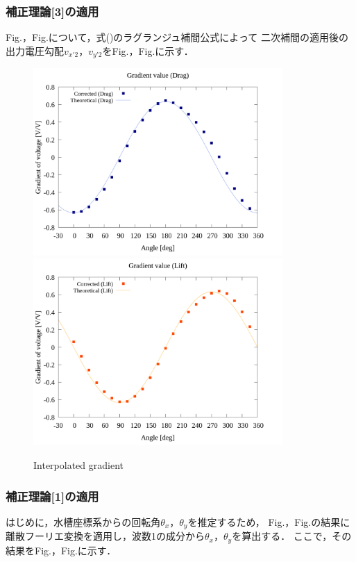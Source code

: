 \newpage

\subsubsection{補正理論[3]の適用}
Fig.，Fig.について，式()のラグランジュ補間公式によって
二次補間の適用後の出力電圧勾配$v_{x'2}$，$v_{y'2}$をFig.，Fig.に示す．

\begin{figure}[htbp]
  \begin{center}
    \includegraphics[width=95mm]{../../02_workspace/result/2-ex/plot/21/21-3_interpolated_drag.png}
    \includegraphics[width=95mm]{../../02_workspace/result/2-ex/plot/21/21-3_interpolated_lift.png}
  \end{center}
  \caption{Interpolated gradient}
\end{figure}

\newpage

\subsubsection{補正理論[1]の適用}
はじめに，水槽座標系からの回転角$\theta_x$，$\theta_y$を推定するため，
Fig.，Fig.の結果に離散フーリエ変換を適用し，波数1の成分から$\theta_x$，$\theta_y$を算出する．
ここで，その結果をFig.，Fig.に示す．

